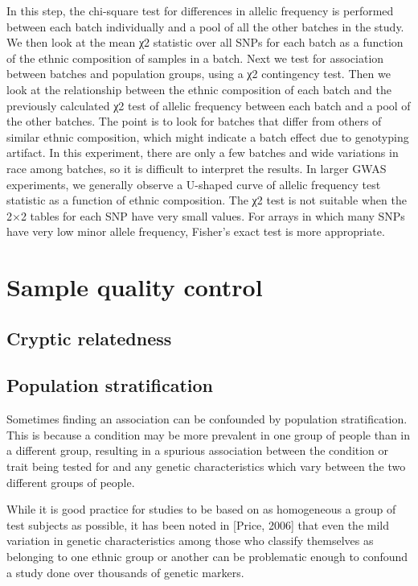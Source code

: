 \documentclass[
]{book}
\begin{document}
In this step, the chi-square test for diﬀerences in allelic frequency is performed between each batch individually and a pool of all the other batches in the study. We then look at the mean χ2 statistic over all SNPs for each batch as a function of the ethnic composition of samples in a batch.
Next we test for association between batches and population groups, using a χ2 contingency test. Then we look at the relationship between the ethnic composition of each batch and the previously calculated χ2 test of allelic frequency between each batch and a pool of the other batches. The point is to look for batches that diﬀer from others of similar ethnic composition, which might indicate a batch eﬀect due to genotyping artifact. In this experiment, there are only a few batches and wide variations in race among batches, so it is diﬃcult to interpret the results. In larger GWAS experiments, we generally observe a U-shaped curve of allelic frequency test statistic as a function of ethnic composition.
The χ2 test is not suitable when the 2×2 tables for each SNP have very small values. For arrays in which many SNPs have very low minor allele frequency, Fisher's exact test is more appropriate.

\hypertarget{sample-quality-control}{%
\section{Sample quality control}\label{sample-quality-control}}

\hypertarget{cryptic-relatedness}{%
\subsection{Cryptic relatedness}\label{cryptic-relatedness}}

\hypertarget{population-stratification}{%
\subsection{Population stratification}\label{population-stratification}}

Sometimes finding an association can be confounded by population stratification. This is because a condition may be more prevalent in one group of people than in a different group, resulting in a spurious association between the condition or trait being tested for and any genetic characteristics which vary between the two different groups of people.

While it is good practice for studies to be based on as homogeneous a group of test subjects as possible, it has been noted in {[}Price, 2006{]} that even the mild variation in genetic characteristics among those who classify themselves as belonging to one ethnic group or another can be problematic enough to confound a study done over thousands of genetic markers.
\end{document}
